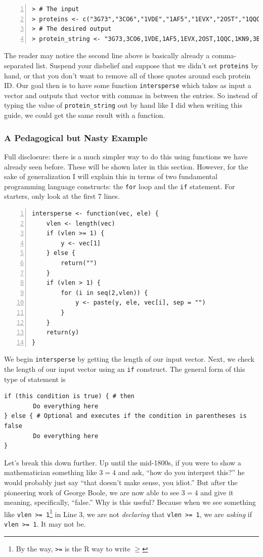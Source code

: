 \documentclass[12pt]{article}
\theoremstyle{remark}
\begin{document}
\begin{Verbatim}[frame=single, fontsize=\small, numbers=left]
> # The input
> proteins <- c("3G73","3CO6","1VDE","1AF5","1EVX","2OST","1QQC","1KN9","3BF0")
> # The desired output
> protein_string <- "3G73,3CO6,1VDE,1AF5,1EVX,2OST,1QQC,1KN9,3BF0"
\end{Verbatim}

The reader may notice the second line above is basically already a comma-separated list. Suspend your disbelief and suppose that we didn't set \verb|proteins| by hand, or that you don't want to remove all of those quotes around each protein ID. Our goal then is to have some function \verb|intersperse| which takes as input a vector and outputs that vector with commas in between the entries. So instead of typing the value of \verb|protein_string| out by hand like I did when writing this guide, we could get the same result with a function.

\subsubsection{A Pedagogical but Nasty Example}
Full disclosure: there is a much simpler way to do this using functions we have already seen before. These will be shown later in this section. However, for the sake of generalization I will explain this in terms of two fundamental programming language constructs: the \verb|for| loop and the \verb|if| statement. For starters, only look at the first 7 lines.

\begin{Verbatim}[frame=single, fontsize=\small, numbers=left]
intersperse <- function(vec, ele) {
	vlen <- length(vec)
	if (vlen >= 1) {
		y <- vec[1]
	} else {
		return("")
	}
	if (vlen > 1) {
		for (i in seq(2,vlen)) {
			y <- paste(y, ele, vec[i], sep = "")
		}
	}
	return(y)
}
\end{Verbatim}

We begin \verb|intersperse| by getting the length of our input vector. Next, we check the length of our input vector using an \verb|if| construct. The general form of this type of statement is
\begin{verbatim}
if (this condition is true) { # then
        Do everything here
} else { # Optional and executes if the condition in parentheses is false
        Do everything here
}
\end{verbatim}

Let's break this down further. Up until the mid-1800s, if you were to show a mathematician something like $3 = 4$ and ask, ``how do you interpret this?'' he would probably just say ``that doesn't make sense, you idiot.'' But after the pioneering work of George Boole, we are now able to see $3 = 4$ and give it meaning, specifically, ``false.'' Why is this useful? Because when we see something like \verb|vlen >= 1|\footnote{By the way, \verb|>=| is the R way to write $\ge$} in Line 3, we are not \emph{declaring} that \verb|vlen >= 1|, we are \emph{asking} if \verb|vlen >= 1|. It may not be.
\end{document}
